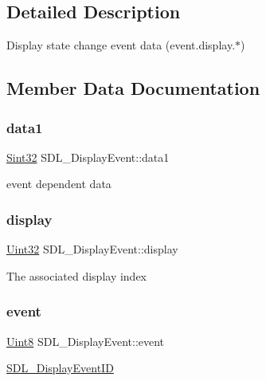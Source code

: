 \subsection{Detailed Description}
Display state change event data (event.\+display.$\ast$) 

\subsection{Member Data Documentation}
\mbox{\label{struct_s_d_l___display_event_a4feb7329af16a060cc16d539e5cb13b5}} 
\subsubsection{\texorpdfstring{data1}{data1}}
{\footnotesize\ttfamily \mbox{\hyperlink{_s_d_l__stdinc_8h_a7a90b941db9d4582e9ad7abb9940ff7e}{Sint32}} S\+D\+L\+\_\+\+Display\+Event\+::data1}

event dependent data \mbox{\label{struct_s_d_l___display_event_af7159e813fb168a2fdfe5070e6026a39}} 
\subsubsection{\texorpdfstring{display}{display}}
{\footnotesize\ttfamily \mbox{\hyperlink{_s_d_l__stdinc_8h_add440eff171ea5f55cb00c4a9ab8672d}{Uint32}} S\+D\+L\+\_\+\+Display\+Event\+::display}

The associated display index \mbox{\label{struct_s_d_l___display_event_a4850a90c06e18146d6a2ac235cdd7336}} 
\subsubsection{\texorpdfstring{event}{event}}
{\footnotesize\ttfamily \mbox{\hyperlink{_s_d_l__stdinc_8h_a2944638813a090aa23e62f4da842c3e2}{Uint8}} S\+D\+L\+\_\+\+Display\+Event\+::event}

\mbox{\hyperlink{_s_d_l__video_8h_ad671b39d95c255af51db93cb54512ffc}{S\+D\+L\+\_\+\+Display\+Event\+ID}} \mbox{\label{struct_s_d_l___display_event_a8a6937d7483828f3b9ac68fb79963e33}} 
